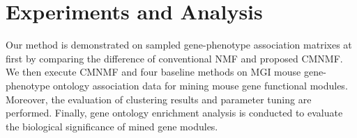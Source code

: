 \documentclass{bmcart}
\begin{document}
\section*{Experiments and Analysis}
Our method is demonstrated on sampled gene-phenotype association matrixes at first by comparing the difference of conventional NMF and proposed CMNMF. We then execute CMNMF and four baseline methods on MGI mouse gene-phenotype ontology association data for mining mouse gene functional modules. Moreover, the evaluation of clustering results and parameter tuning are performed. Finally, gene ontology enrichment analysis is conducted to evaluate the biological significance of mined gene modules.
\end{document}

